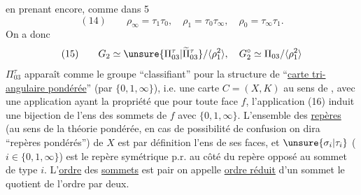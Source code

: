en prenant encore, comme dans 5
\[
(14)\qquad\rho_\infty=\tau_1\tau_0,\quad\rho_1=\tau_0\tau_\infty,\quad\rho_0=\tau_\infty\tau_1.
\]
On a donc
\[
(15)\qquad G_2\simeq\unsure{\Pi_{03}^\tau|\widetilde\Pi_{03}^\tau}/\langle\rho_1^2\rangle,
\quad G_2^\circ\simeq\Pi_{03}/\langle\rho_1^2\rangle
\]
   $\Pi_{03}^\tau$ apparaît comme le groupe ``classifiant'' pour la structure de ``\uline{carte tri-angulaire pondérée}'' (par $\{0,1,\infty\}$), i.e. une carte $C=(X,K)$ au sens de , avec  une application
ayant la propriété que pour toute face $f$, l'application (16) induit une bijection de l'ens des sommets de $f$ avec $\{0,1,\infty\}$. L'ensemble des \uline{repères} (au sens de la théorie  pondérée, en cas de possibilité de confusion on dira ``repères pondérés'') de $X$ est par définition l'ens de ses faces, et $\unsure{\sigma_i|\tau_i}$ ($i\in\{0,1,\infty\}$) est le  repère symétrique p.r. au  côté du repère opposé au  sommet de type $i$. L'\uline{ordre} des \uline{sommets} est pair on appelle \uline{ordre réduit} d'un sommet le quotient de l'ordre par  deux.

